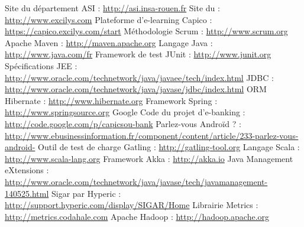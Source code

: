 \begin{thebibliography}{2}
	
	 Site du département ASI : \url{http://asi.insa-rouen.fr}
	 Site du \excilysGroup{} : \url{http://www.excilys.com}
	 Plateforme d'e-learning Capico : \url{https://capico.excilys.com/start}
	 Méthodologie Scrum : \url{http://www.scrum.org}
	 Apache Maven : \url{http://maven.apache.org}
	 Langage Java : \url{http://www.java.com/fr}
	 Framework de test JUnit : \url{http://www.junit.org}
	 Spécifications JEE : \url{http://www.oracle.com/technetwork/java/javaee/tech/index.html}
	 JDBC : \url{http://www.oracle.com/technetwork/java/javase/jdbc/index.html}
	 ORM Hibernate : \url{http://www.hibernate.org}
	 Framework Spring : \url{http://www.springsource.org}
	 Google Code du projet d'e-banking : \url{http://code.google.com/p/capicsou-bank}
	 Parlez-vous Androïd ? : \url{http://www.ebusinessinformation.fr/component/content/article/233-parlez-vous-android-}
	 Outil de test de charge Gatling : \url{http://gatling-tool.org}
	 Langage Scala : \url{http://www.scala-lang.org}
	 Framework Akka : \url{http://akka.io}
	 Java Management eXtensions : \url{http://www.oracle.com/technetwork/java/javase/tech/javamanagement-140525.html}
	 Sigar par Hyperic : \url{http://support.hyperic.com/display/SIGAR/Home}
	 Librairie Metrics : \url{http://metrics.codahale.com}
	 Apache Hadoop : \url{http://hadoop.apache.org}
\end{thebibliography}
